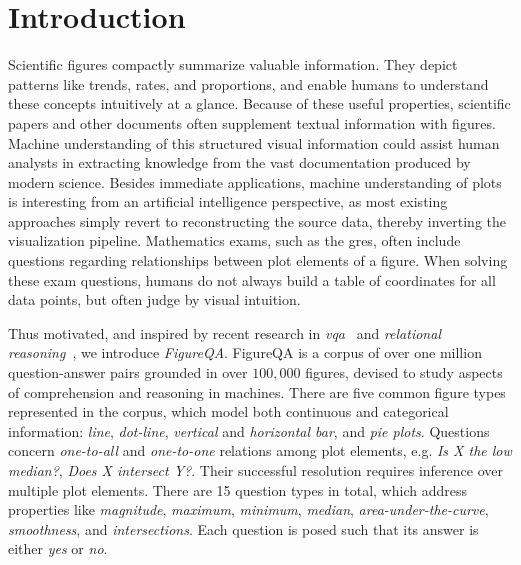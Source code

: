 \documentclass{article} \usepackage{iclr2018_workshop,times}
\begin{document}
\section{Introduction}
Scientific figures compactly summarize valuable information. They depict patterns like trends, rates, and proportions, and enable humans to understand these concepts intuitively at a glance.
Because of these useful properties, scientific papers and other documents often supplement textual information with figures.
Machine understanding of this structured visual information could assist human analysts in extracting knowledge from the vast documentation produced by modern science. 
Besides immediate applications, machine understanding of plots is interesting from an artificial intelligence perspective, as most existing approaches simply revert to reconstructing the source data, thereby inverting the visualization pipeline. Mathematics exams, such as the \glspl{gre}, often include questions regarding relationships between plot elements of a figure. When solving these exam questions, humans do not always build a table of coordinates for all data points, but often judge by visual intuition.

Thus motivated, and inspired by recent research in \emph{\gls{vqa}}~\citep{antol2015vqa,goyal2016making} and \emph{relational reasoning}~\citep{johnson2016clevr,suhr2017corpus}, we introduce \emph{FigureQA}.
FigureQA is a corpus of over one million question-answer pairs grounded in over $100,000$ figures, devised to study aspects of comprehension and reasoning in machines.
There are five common figure types represented in the corpus, which model both continuous and categorical information: \emph{line}, \emph{dot-line}, \emph{vertical} and \emph{horizontal bar}, and \emph{pie plots}.
Questions concern \emph{one-to-all} and \emph{one-to-one} relations among plot elements, e.g. \emph{Is X the low median?}, \emph{Does X intersect Y?}. Their successful resolution requires inference over multiple plot elements.
There are 15 question types in total, which address properties like \emph{magnitude}, \emph{maximum}, \emph{minimum}, \emph{median}, \emph{area-under-the-curve}, \emph{smoothness}, and \emph{intersections}. Each question is posed such that its answer is either \emph{yes} or \emph{no}.
\end{document}

